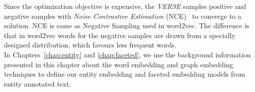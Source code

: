Since the optimization objective is expensive, the \emph{VERSE} samples positive and negative samples with \emph{Noise Contrastive Estimation} (NCE)~ to converge to a solution. NCE is same as Negative Sampling used in word2vec. The difference is that in word2vec words for the negative samples are drawn from a specially designed distribution, which favours less frequent words. \\


In Chapters~\ref{chap:entity} and \ref{chap:faceted}, we use the background information presented in this chapter about the word embedding and graph embedding techniques to define our entity embedding and faceted embedding models from entity annotated text.
